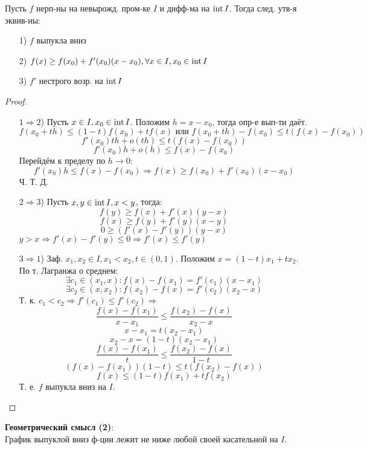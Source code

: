\begin{theorem}
  \label{th:vip}
Пусть $f$ нерп-ны на невырожд. пром-ке $I$ и дифф-ма на $\operatorname{int} I$. Тогда след. утв-я эквив-ны:
\begin{itemize}
  \item [1) ]$f$ выпукла вниз 
  \item [2) ]$f(x) \geq f(x_0) + f'(x_0)(x - x_0), \forall x \in I, x_0 \in \operatorname{int} I$
  \item [3) ] $f'$ нестрого возр. на $\operatorname{int} I$
\end{itemize}
\begin{proof}
  ~\newline
\begin{itemize}
  \item [$1 \Rightarrow 2$)] Пусть $x \in I, x_0 \in \operatorname{int} I$. Положим $h = x - x_0$, тогда опр-е вып-ти даёт.
    \[
    f(x_0 + th) \leq (1 - t)f(x_0) + tf(x) \text{ или } f(x_0 + th) - f(x_0) \leq t(f(x) - f(x_0))
    \]
    \[
    f'(x_0)t h + o(t h) \leq t(f(x) - f(x_0))
    \]
    \[
    f'(x_0) h + o(h) \leq f(x) - f(x_0)
    \]
    Перейдём к пределу по $h \rightarrow 0$:
    \[
    f'(x_0) h \leq f(x) - f(x_0) \Rightarrow f(x) \geq f(x_0) + f'(x_0) (x - x_0)
    \]
    Ч. Т. Д.
  \item [$2 \Rightarrow 3$)] Пусть $x, y \in \operatorname{int} I, x < y$, тогда:
    \[
    f(y) \geq f(x) + f'(x)(y - x)
    \]
    \[
    f(x) \geq f(y) + f'(y)(x - y)
    \]
    \[
    0 \geq (f'(x) - f'(y))(y - x)
    \]
    $y > x \Rightarrow f'(x) - f'(y) \leq 0 \Rightarrow f'(x) \leq f'(y)$
  \item [$3 \Rightarrow 1$) ] Заф. $x_1, x_2 \in I, x_1 < x_2, t \in (0, 1)$. Положим $x =  (1 - t)x_1 + tx_2$. По т. Лагранжа о среднем:
    \[
    \exists c_1 \in (x_1, x) \colon f(x) - f(x_1) = f'(c_1)(x - x_1)
    \]
    \[
    \exists c_2 \in (x, x_2) \colon f(x_2) - f(x) = f'(c_2) (x_2 - x) 
    \]
    Т. к. $c_1 < c_2 \Rightarrow f'(c_1) \leq f'(c_2) \Rightarrow$
    \[
      \frac{f(x) - f(x_1)}{x - x_1} \leq \frac{f(x_2) - f(x)}{x_2 - x}
    \]
    \[
    x - x_1 = t(x_2 - x_1)
    \]
    \[
    x_2 - x = (1 - t)(x_2 - x_1)
    \]
    \[
      \frac{f(x) - f(x_1)}{t} \leq \frac{f(x_2) - f(x)}{1 - t}
    \]
    \[
      (f(x) - f(x_1))(1 - t) \leq t(f(x_2) - f(x))
    \]
    \[
      f(x) \leq (1 - t)f(x_1) + tf(x_2)
    \]
    Т. е. $f$ выпукла вниз на $I$.
\end{itemize}
\end{proof}
\end{theorem}
\textbf{Геометрический смысл (2)}:\\
График выпуклой вниз ф-ции лежит не ниже любой своей касательной на $I$.

